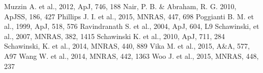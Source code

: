 \documentclass[12pt, usenatbib]{article}
\begin{document}
\begin{thebibliography}{}
\begin{multicols}{2}
 Muzzin A. et al., 2012, ApJ, 746, 188
 Nair, P. B. \& Abraham, R. G. 2010, ApJSS, 186, 427
 Phillips J. I. et al., 2015, MNRAS, 447, 698
 Poggianti B. M. et al., 1999, ApJ,
518, 576
 Ravindranath S. et al., 2004, ApJ, 604, L9
 Schawinski, et al., 2007, MNRAS, 382, 1415
 Schawinski K. et al., 2010, ApJ, 711, 284
 Schawinski, K. et al., 2014, MNRAS, 440, 889
 Vika M. et al., 2015, A\&A, 577, A97
 Wang W. et al., 2014, MNRAS, 442, 1363
 Woo J. et al., 2015, MNRAS,
448, 237

\end{multicols}
\end{thebibliography}
\end{document}
